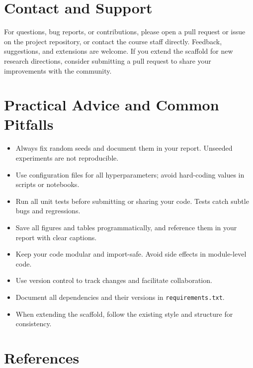 \documentclass[11pt]{article}
\begin{document}
\section{Contact and Support}
For questions, bug reports, or contributions, please open a pull request or issue on the project repository, or contact the course staff directly. Feedback, suggestions, and extensions are welcome. If you extend the scaffold for new research directions, consider submitting a pull request to share your improvements with the community.

\section*{Practical Advice and Common Pitfalls}
\begin{itemize}
  \item Always fix random seeds and document them in your report. Unseeded experiments are not reproducible.
  \item Use configuration files for all hyperparameters; avoid hard-coding values in scripts or notebooks.
  \item Run all unit tests before submitting or sharing your code. Tests catch subtle bugs and regressions.
  \item Save all figures and tables programmatically, and reference them in your report with clear captions.
  \item Keep your code modular and import-safe. Avoid side effects in module-level code.
  \item Use version control to track changes and facilitate collaboration.
  \item Document all dependencies and their versions in \texttt{requirements.txt}.
  \item When extending the scaffold, follow the existing style and structure for consistency.
\end{itemize}

\section*{References}


\end{document}
